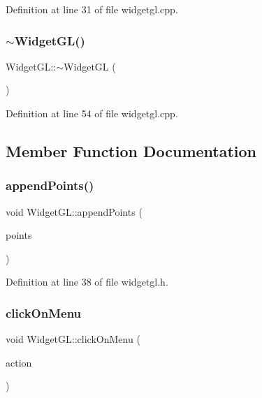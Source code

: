 Definition at line 31 of file widgetgl.\+cpp.

\mbox{\label{class_widget_g_l_a5e294f58b475b861117b88c21db50c54}} 
\subsubsection{\texorpdfstring{$\sim$WidgetGL()}{~WidgetGL()}}
{\footnotesize\ttfamily Widget\+G\+L\+::$\sim$\+Widget\+GL (\begin{DoxyParamCaption}{ }\end{DoxyParamCaption})}



Definition at line 54 of file widgetgl.\+cpp.



\subsection{Member Function Documentation}
\mbox{\label{class_widget_g_l_ac23d8fad01c9c108aff1e856433d94c9}} 
\subsubsection{\texorpdfstring{appendPoints()}{appendPoints()}}
{\footnotesize\ttfamily void Widget\+G\+L\+::append\+Points (\begin{DoxyParamCaption}\item[{vector$<$ \mbox{\hyperlink{struct_vector3d}{Vector3d}} $\ast$ $>$}]{points }\end{DoxyParamCaption})\hspace{0.3cm}{\ttfamily [inline]}}



Definition at line 38 of file widgetgl.\+h.

\mbox{\label{class_widget_g_l_ad3cc6174d1701a50ce9c099f735e24f6}} 
\subsubsection{\texorpdfstring{clickOnMenu}{clickOnMenu}}
{\footnotesize\ttfamily void Widget\+G\+L\+::click\+On\+Menu (\begin{DoxyParamCaption}\item[{Q\+Action $\ast$}]{action }\end{DoxyParamCaption})\hspace{0.3cm}{\ttfamily [slot]}}



